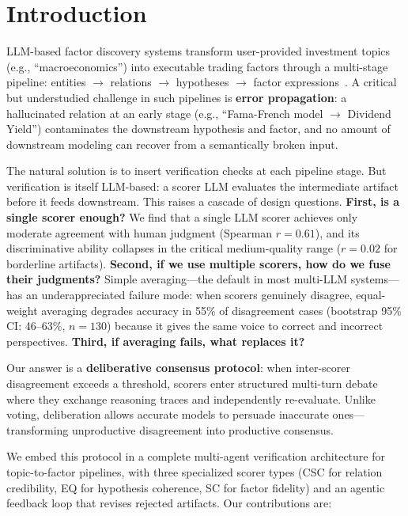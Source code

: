 \documentclass[sigconf]{acmart}
\begin{document}
\section{Introduction}

LLM-based factor discovery systems transform user-provided investment topics (e.g., ``macroeconomics'') into executable trading factors through a multi-stage pipeline: entities $\rightarrow$ relations $\rightarrow$ hypotheses $\rightarrow$ factor expressions~\cite{wang2024alphagpt,tang2025alphaagent}. A critical but understudied challenge in such pipelines is \textbf{error propagation}: a hallucinated relation at an early stage (e.g., ``Fama-French model $\rightarrow$ Dividend Yield'') contaminates the downstream hypothesis and factor, and no amount of downstream modeling can recover from a semantically broken input.

The natural solution is to insert verification checks at each pipeline stage. But verification is itself LLM-based: a scorer LLM evaluates the intermediate artifact before it feeds downstream. This raises a cascade of design questions. \textbf{First, is a single scorer enough?} We find that a single LLM scorer achieves only moderate agreement with human judgment (Spearman $r{=}0.61$), and its discriminative ability collapses in the critical medium-quality range ($r{=}0.02$ for borderline artifacts). \textbf{Second, if we use multiple scorers, how do we fuse their judgments?} Simple averaging---the default in most multi-LLM systems---has an underappreciated failure mode: when scorers genuinely disagree, equal-weight averaging degrades accuracy in 55\% of disagreement cases (bootstrap 95\% CI: 46--63\%, $n{=}130$) because it gives the same voice to correct and incorrect perspectives. \textbf{Third, if averaging fails, what replaces it?}

Our answer is a \textbf{deliberative consensus protocol}: when inter-scorer disagreement exceeds a threshold, scorers enter structured multi-turn debate where they exchange reasoning traces and independently re-evaluate. Unlike voting, deliberation allows accurate models to persuade inaccurate ones---transforming unproductive disagreement into productive consensus.

We embed this protocol in a complete multi-agent verification architecture for topic-to-factor pipelines, with three specialized scorer types (CSC for relation credibility, EQ for hypothesis coherence, SC for factor fidelity) and an agentic feedback loop that revises rejected artifacts. Our contributions are:
\end{document}
